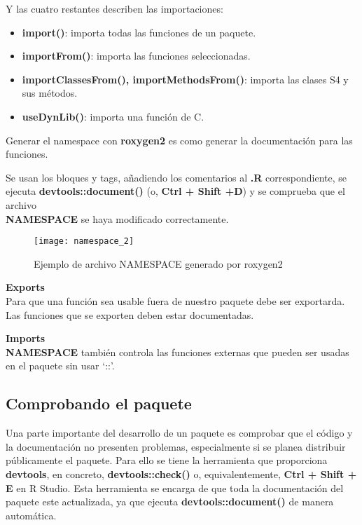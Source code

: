 Y las cuatro restantes describen las importaciones:
\begin{itemize}
    \item \textbf{import()}: importa todas las funciones de un paquete.
    \item \textbf{importFrom()}: importa las funciones seleccionadas.
    \item \textbf{importClassesFrom(), importMethodsFrom()}: importa las clases S4 y sus
m\'etodos.
    \item \textbf{useDynLib()}: importa una funci\'on de C.
\end{itemize}

Generar el namespace con \textbf{roxygen2} es como generar la documentaci\'on para las funciones.

Se usan los bloques y tags, a\~nadiendo los comentarios al \textbf{.R} correspondiente, se ejecuta
\textbf{devtools::document()} (o, \textbf{Ctrl + Shift +D}) y se comprueba que el archivo \\ \textbf{NAMESPACE} se
haya modificado correctamente.\\

\begin{figure}[H]
    \centering
    \texttt{[image: namespace\_2]}
    \caption{Ejemplo de archivo NAMESPACE generado por roxygen2 }
    \label{fig:namespace}
\end{figure} 

\textbf{Exports}\\
Para que una funci\'on sea usable fuera de nuestro paquete debe ser exportarda. Las funciones que se exporten deben estar documentadas.

\textbf{Imports}\\
\textbf{NAMESPACE} tambi\'en controla las funciones externas que pueden ser usadas en el
paquete sin usar \enquote*{::}.

\subsection{Comprobando el paquete}

Una parte importante del desarrollo de un paquete es comprobar que el c\'odigo y la
documentaci\'on no presenten problemas, especialmente si se planea distribuir p\'ublicamente
el paquete. Para ello se tiene la herramienta que proporciona \textbf{devtools}, en concreto,
\textbf{devtools::check()} o, equivalentemente, \textbf{Ctrl + Shift + E} en R Studio.
Esta herramienta se encarga de que toda la documentaci\'on del paquete este actualizada, ya
que ejecuta \textbf{devtools::document()} de manera autom\'atica.

